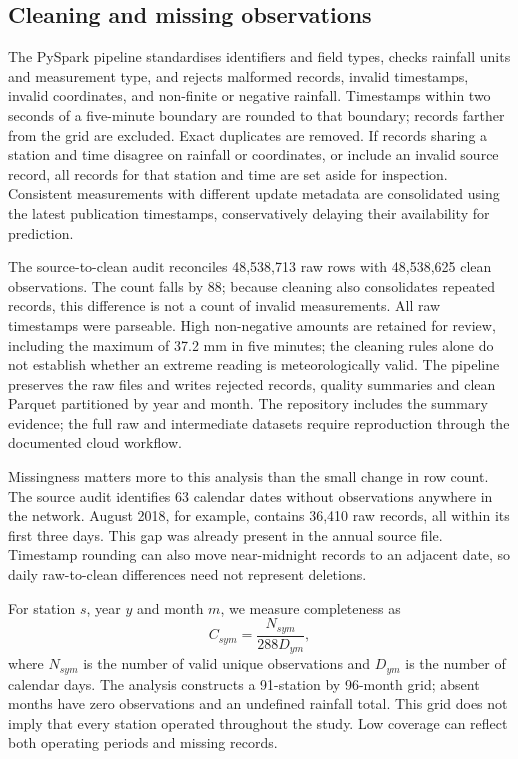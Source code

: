 \documentclass[11pt,a4paper]{article}
\begin{document}
\subsection{Cleaning and missing observations}
The PySpark pipeline standardises identifiers and field types, checks rainfall units and measurement type, and rejects malformed records, invalid timestamps, invalid coordinates, and non-finite or negative rainfall. Timestamps within two seconds of a five-minute boundary are rounded to that boundary; records farther from the grid are excluded. Exact duplicates are removed. If records sharing a station and time disagree on rainfall or coordinates, or include an invalid source record, all records for that station and time are set aside for inspection. Consistent measurements with different update metadata are consolidated using the latest publication timestamps, conservatively delaying their availability for prediction.

The source-to-clean audit reconciles 48,538,713 raw rows with 48,538,625 clean observations. The count falls by 88; because cleaning also consolidates repeated records, this difference is not a count of invalid measurements. All raw timestamps were parseable. High non-negative amounts are retained for review, including the maximum of 37.2 mm in five minutes; the cleaning rules alone do not establish whether an extreme reading is meteorologically valid. The pipeline preserves the raw files and writes rejected records, quality summaries and clean Parquet partitioned by year and month. The repository includes the summary evidence; the full raw and intermediate datasets require reproduction through the documented cloud workflow.

Missingness matters more to this analysis than the small change in row count. The source audit identifies 63 calendar dates without observations anywhere in the network. August 2018, for example, contains 36,410 raw records, all within its first three days. This gap was already present in the annual source file. Timestamp rounding can also move near-midnight records to an adjacent date, so daily raw-to-clean differences need not represent deletions.

For station $s$, year $y$ and month $m$, we measure completeness as
\[
 C_{sym}=\frac{N_{sym}}{288D_{ym}},
\]
where $N_{sym}$ is the number of valid unique observations and $D_{ym}$ is the number of calendar days. The analysis constructs a 91-station by 96-month grid; absent months have zero observations and an undefined rainfall total. This grid does not imply that every station operated throughout the study. Low coverage can reflect both operating periods and missing records.
\end{document}
